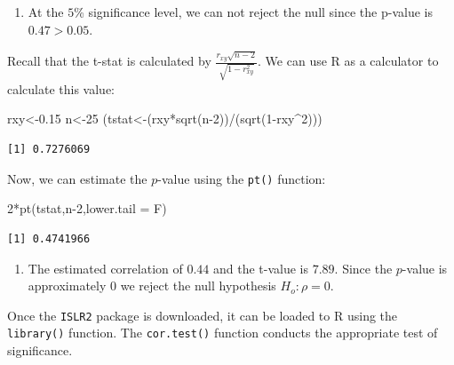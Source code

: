 \documentclass[
  letterpaper,
  DIV=11,
  numbers=noendperiod]{scrreprt}
\newenvironment{Shaded}{\begin{snugshade}}{\end{snugshade}}
\newcommand{\AttributeTok}[1]{\textcolor[rgb]{0.40,0.45,0.13}{#1}}
\newcommand{\DecValTok}[1]{\textcolor[rgb]{0.68,0.00,0.00}{#1}}
\newcommand{\FloatTok}[1]{\textcolor[rgb]{0.68,0.00,0.00}{#1}}
\newcommand{\FunctionTok}[1]{\textcolor[rgb]{0.28,0.35,0.67}{#1}}
\newcommand{\NormalTok}[1]{\textcolor[rgb]{0.00,0.23,0.31}{#1}}
\newcommand{\OtherTok}[1]{\textcolor[rgb]{0.00,0.23,0.31}{#1}}
\newcommand{\SpecialCharTok}[1]{\textcolor[rgb]{0.37,0.37,0.37}{#1}}
\providecommand{\tightlist}{%
  \setlength{\itemsep}{0pt}\setlength{\parskip}{0pt}}\usepackage{longtable,booktabs,array}
\begin{document}
\begin{enumerate}
\def\labelenumi{\arabic{enumi}.}
\tightlist
\item
  At the \(5\)\% significance level, we can not reject the null since
  the p-value is \(0.47>0.05\).
\end{enumerate}

Recall that the t-stat is calculated by
\(\frac {r_{xy}\sqrt{n-2}}{\sqrt{1-r_{xy}^2}}\). We can use R as a
calculator to calculate this value:

\begin{Shaded}
\begin{Highlighting}[numbers=left,,]
\NormalTok{rxy}\OtherTok{\textless{}{-}}\FloatTok{0.15}
\NormalTok{n}\OtherTok{\textless{}{-}}\DecValTok{25}
\NormalTok{(tstat}\OtherTok{\textless{}{-}}\NormalTok{(rxy}\SpecialCharTok{*}\FunctionTok{sqrt}\NormalTok{(n}\DecValTok{{-}2}\NormalTok{))}\SpecialCharTok{/}\NormalTok{(}\FunctionTok{sqrt}\NormalTok{(}\DecValTok{1}\SpecialCharTok{{-}}\NormalTok{rxy}\SpecialCharTok{\^{}}\DecValTok{2}\NormalTok{)))}
\end{Highlighting}
\end{Shaded}

\begin{verbatim}
[1] 0.7276069
\end{verbatim}

Now, we can estimate the \(p\)-value using the \texttt{pt()} function:

\begin{Shaded}
\begin{Highlighting}[numbers=left,,]
\DecValTok{2}\SpecialCharTok{*}\FunctionTok{pt}\NormalTok{(tstat,n}\DecValTok{{-}2}\NormalTok{,}\AttributeTok{lower.tail =}\NormalTok{ F)}
\end{Highlighting}
\end{Shaded}

\begin{verbatim}
[1] 0.4741966
\end{verbatim}

\begin{enumerate}
\def\labelenumi{\arabic{enumi}.}
\setcounter{enumi}{1}
\tightlist
\item
  The estimated correlation of \(0.44\) and the t-value is \(7.89\).
  Since the \(p\)-value is approximately \(0\) we reject the null
  hypothesis \(H_{o}: \rho=0\).
\end{enumerate}

Once the \texttt{ISLR2} package is downloaded, it can be loaded to R
using the \texttt{library()} function. The \texttt{cor.test()} function
conducts the appropriate test of significance.
\end{document}
